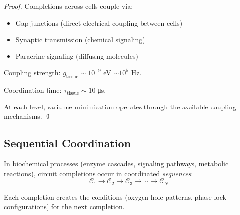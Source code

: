 \begin{proof}
Completions across cells couple via:
\begin{itemize}
\item Gap junctions (direct electrical coupling between cells)
\item Synaptic transmission (chemical signaling)
\item Paracrine signaling (diffusing molecules)
\end{itemize}

Coupling strength: $g_{\text{tissue}} \sim 10^{-9}$ eV $\sim 10^{5}$ Hz.

Coordination time: $\tau_{\text{tissue}} \sim 10$ μs.

At each level, variance minimization operates through the available coupling mechanisms. \qed
\end{proof}

\subsection{Sequential Coordination}

\begin{theorem}
\label{thm:sequential_completion}
In biochemical processes (enzyme cascades, signaling pathways, metabolic reactions), circuit completions occur in coordinated \textit{sequences}:
\begin{equation}
\mathcal{C}_1 \to \mathcal{C}_2 \to \mathcal{C}_3 \to \cdots \to \mathcal{C}_N
\end{equation}

Each completion creates the conditions (oxygen hole patterns, phase-lock configurations) for the next completion.
\end{theorem}

